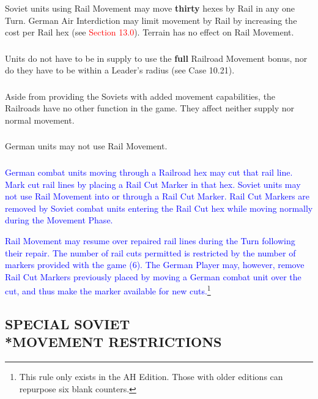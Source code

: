\subsubsection{} Soviet units using Rail Movement may move \textbf{thirty} hexes by Rail in any one Turn. German Air Interdiction may limit movement by Rail by increasing the cost per Rail hex (see \textcolor{red}{Section 13.0}). Terrain has no effect on Rail Movement.

\subsubsection{} Units do not have to be in supply to use the \textbf{full} Railroad Movement bonus, nor do they have to be within a Leader's radius (see Case 10.21).

\subsubsection{} Aside from providing the Soviets with added movement capabilities, the Railroads have no other function in the game. They affect neither supply nor normal movement.

\subsubsection{} German units may not use Rail Movement.
\nobreak
\textcolor{blue}{\subsubsection{} German combat units moving through a Railroad hex may cut that rail line.  Mark cut rail lines by placing a
Rail Cut Marker in that hex. Soviet units may not use Rail Movement into or through a Rail Cut Marker.  Rail Cut Markers are removed by
Soviet combat units entering the Rail Cut hex while moving normally during the Movement Phase.}

\textcolor{blue}{Rail Movement may resume over repaired rail lines during the Turn following their repair.  The number of rail cuts permitted is restricted by the number of markers provided with the game (6).  The German Player may, however, remove Rail Cut Markers previously placed by moving a German combat unit over the cut, and thus make the marker available for new cuts.}\footnote{This rule only exists in the AH Edition. Those with older editions can repurpose six blank counters.}

\subsection{SPECIAL SOVIET\\*MOVEMENT RESTRICTIONS}

